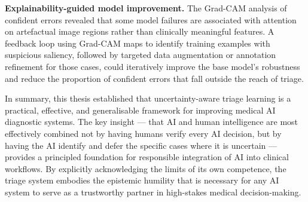 \textbf{Explainability-guided model improvement.} The Grad-CAM analysis of confident errors revealed that some model failures are associated with attention on artefactual image regions rather than clinically meaningful features. A feedback loop using Grad-CAM maps to identify training examples with suspicious saliency, followed by targeted data augmentation or annotation refinement for those cases, could iteratively improve the base model's robustness and reduce the proportion of confident errors that fall outside the reach of triage.

In summary, this thesis established that uncertainty-aware triage learning is a practical, effective, and generalisable framework for improving medical AI diagnostic systems. The key insight --- that AI and human intelligence are most effectively combined not by having humans verify every AI decision, but by having the AI identify and defer the specific cases where it is uncertain --- provides a principled foundation for responsible integration of AI into clinical workflows. By explicitly acknowledging the limits of its own competence, the triage system embodies the epistemic humility that is necessary for any AI system to serve as a trustworthy partner in high-stakes medical decision-making.